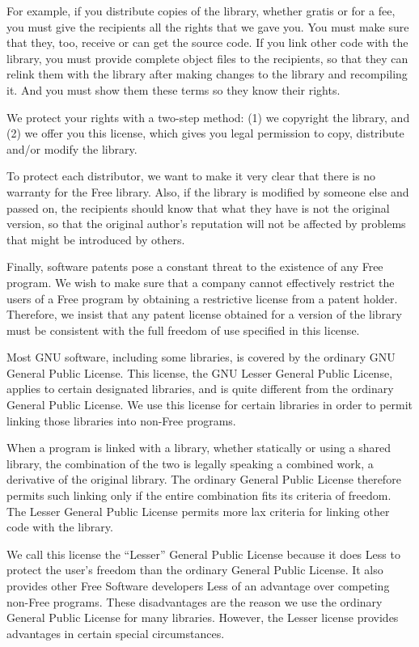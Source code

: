 \documentclass[11pt, letterpaper]{book}
\begin{document}
For example, if you distribute copies of the library, whether gratis or
for a fee, you must give the recipients all the rights that we gave you.
You must make sure that they, too, receive or can get the source code. If
you link other code with the library, you must provide complete object
files to the recipients, so that they can relink them with the library
after making changes to the library and recompiling it. And you must show
them these terms so they know their rights.

We protect your rights with a two-step method: (1) we copyright the
library, and (2) we offer you this license, which gives you legal
permission to copy, distribute and/or modify the library.

To protect each distributor, we want to make it very clear that there is
no warranty for the Free library. Also, if the library is modified by
someone else and passed on, the recipients should know that what they have
is not the original version, so that the original author's reputation will
not be affected by problems that might be introduced by others.

Finally, software patents pose a constant threat to the existence of any
Free program. We wish to make sure that a company cannot effectively
restrict the users of a Free program by obtaining a restrictive license
from a patent holder. Therefore, we insist that any patent license
obtained for a version of the library must be consistent with the full
freedom of use specified in this license.

Most GNU software, including some libraries, is covered by the ordinary
GNU General Public License. This license, the GNU Lesser General Public
License, applies to certain designated libraries, and is quite different
from the ordinary General Public License. We use this license for certain
libraries in order to permit linking those libraries into non-Free
programs.

When a program is linked with a library, whether statically or using a
shared library, the combination of the two is legally speaking a combined
work, a derivative of the original library. The ordinary General Public
License therefore permits such linking only if the entire combination fits
its criteria of freedom. The Lesser General Public License permits more
lax criteria for linking other code with the library.

We call this license the ``Lesser'' General Public License because it does
Less to protect the user's freedom than the ordinary General Public
License. It also provides other Free Software developers Less of an
advantage over competing non-Free programs. These disadvantages are the
reason we use the ordinary General Public License for many libraries.
However, the Lesser license provides advantages in certain special
circumstances.
\end{document}
